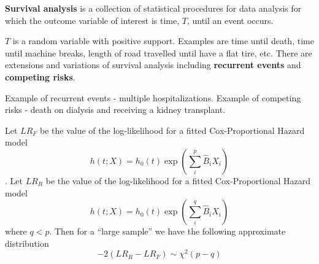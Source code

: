 \documentclass{article}
\begin{document}

 \textbf{Survival analysis} is a collection of statistical procedures for data analysis for which the outcome variable of interest is time, $T$, until an event occurs.

\bn
\im $T$ is a random variable with positive support. Examples are time until death, time until machine breaks, length of road travelled until have a flat tire, etc.
\im There are extensions and variations of survival analysis including \textbf{recurrent events} and \textbf{competing risks}.
\item Example of recurrent events - multiple hospitalizations. Example of competing risks - death on dialysis and receiving a kidney transplant.
\en
{}

 Let $LR_F$ be the value of the log-likelihood for a fitted Cox-Proportional Hazard model
\[ h(t;X) = h_0(t) \exp(\sum_i^p \hat{B}_iX_i) \].
Let $LR_R$ be the value of the log-likelihood for a fitted Cox-Proportional Hazard model
\[ h(t;X) = h_0(t) \exp(\sum_i^q \hat{B}_iX_i) \]
where $q<p$.
Then for a ``large sample'' we have the following approximate distribution
\[
-2(LR_R - LR_F) \sim \chi^2(p-q)
\]
\end{document}
